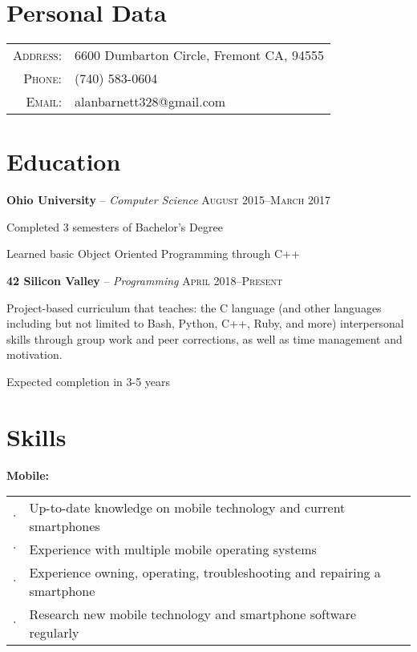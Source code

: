 \documentclass[letterpaper,12pt]{article}
\begin{document}
\pagestyle{empty} %

\par{\bigskip\par}

\section{Personal Data}

\begin{tabular}{rl}
\textsc{Address:} & 6600 Dumbarton Circle, Fremont CA, 94555 \\
\textsc{Phone:} & (740) 583-0604 \\
\textsc{Email:} & alanbarnett328@gmail.com
\end{tabular}

\section{Education}

\textbf{Ohio University} -- \textit{Computer Science} \hfill \textsc{August 2015--March 2017}

\qquad Completed 3 semesters of Bachelor's Degree

\qquad Learned basic Object Oriented Programming through C++

\textbf{42 Silicon Valley} -- \textit{Programming} \hfill \textsc{April 2018--Present}

\qquad Project-based curriculum that teaches:
the C language (and other languages including but not limited to Bash, Python, C++, Ruby, and more)
interpersonal skills through group work and peer corrections,
as well as time management and motivation.

\qquad Expected completion in 3-5 years

\section{Skills}

\textbf{Mobile:}

\begin{tabular}{rl}
$\cdot$ & Up-to-date knowledge on mobile technology and current smartphones \\
$\cdot$ & Experience with multiple mobile operating systems \\
$\cdot$ & Experience owning, operating, troubleshooting and repairing a smartphone \\
$\cdot$ & Research new mobile technology and smartphone software regularly \\
\end{tabular}
\end{document}
